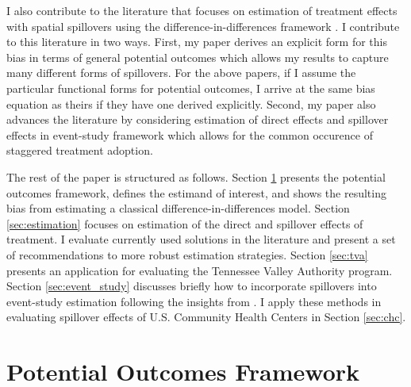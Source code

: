 \documentclass[11pt]{article}
\begin{document}
I also contribute to the literature that focuses on estimation of treatment effects with spatial spillovers using the difference-in-differences framework \citep{Clarke_2017,Berg_Streitz_2019,Verbitsky-Savitz_Raudenbush_2012,Delgado_Florax_2015}. I contribute to this literature in two ways. First, my paper derives an explicit form for this bias in terms of general potential outcomes which allows my results to capture many different forms of spillovers. For the above papers, if I assume the particular functional forms for potential outcomes, I arrive at the same bias equation as theirs if they have one derived explicitly. Second, my paper also advances the literature by considering estimation of direct effects and spillover effects in event-study framework which allows for the common occurence of staggered treatment adoption.

The rest of the paper is structured as follows. Section \ref{sec:po_framework} presents the potential outcomes framework, defines the estimand of interest, and shows the resulting bias from estimating a classical difference-in-differences model. Section \ref{sec:estimation} focuses on estimation of the direct and spillover effects of treatment. I evaluate currently used solutions in the literature and present a set of recommendations to more robust estimation strategies. Section \ref{sec:tva} presents an application for evaluating the Tennessee Valley Authority program. Section \ref{sec:event_study} discusses briefly how to incorporate spillovers into event-study estimation following the insights from \citet{Callaway_SantAnna_2020}. I apply these methods in evaluating spillover effects of U.S. Community Health Centers in Section \ref{sec:chc}.


\section{Potential Outcomes Framework}
\label{sec:po_framework}
\end{document}
